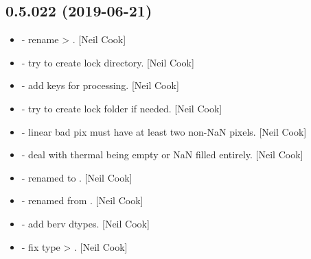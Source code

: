 \documentclass[a4paper,10pt,english]{report}
\begin{document}
\subsection{0.5.022 (2019-06-21)}
\label{\detokenize{misc/changelog:id114}}\begin{itemize}
\item {} 
 - rename  \textendash{}\textgreater{} . {[}Neil Cook{]}

\item {} 
 - try to create lock directory. {[}Neil Cook{]}

\item {} 
 - add keys for processing. {[}Neil Cook{]}

\item {} 
 - try to create lock folder if needed. {[}Neil Cook{]}

\item {} 
 - linear bad pix must have at least two non-NaN pixels.
{[}Neil Cook{]}

\item {} 
 - deal with thermal being empty or NaN filled entirely.
{[}Neil Cook{]}

\item {} 
 - renamed  to . {[}Neil
Cook{]}

\item {} 
 - renamed from . {[}Neil Cook{]}

\item {} 
 - add berv dtypes. {[}Neil Cook{]}

\item {} 
 - fix type  \textendash{}\textgreater{} . {[}Neil
Cook{]}

\end{itemize}
\end{document}
